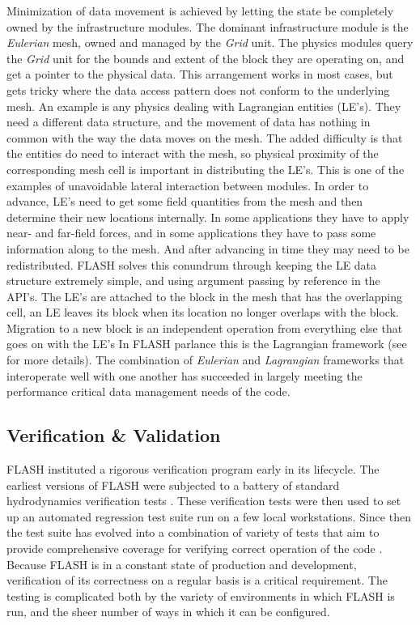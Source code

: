 Minimization of data movement is achieved by letting the state be
completely owned by the infrastructure modules. The dominant
infrastructure module is the {\em Eulerian} mesh, owned and managed by
the {\em Grid} unit. The physics modules query the {\em Grid} unit
for the bounds and extent of the block they are operating on, and
get a pointer to the physical data. This arrangement works in most
cases, but gets tricky where  the data access pattern does not conform
to the underlying mesh. An example is any physics dealing with
Lagrangian entities (LE's). They need a different data structure, and
the movement of data has nothing in common with the way the data moves
on the mesh. The added difficulty is that the entities do need to
interact with the mesh, so physical proximity of the corresponding
mesh cell is important in distributing the LE's. This is one of the
examples of unavoidable lateral interaction between modules. In order
to advance, LE's need to get some field quantities from the mesh and
then determine their new locations internally. In some applications
they have to apply near- and far-field forces, and in some
applications they have to pass some information along to the mesh. And
after advancing in time they may need to be redistributed. FLASH solves
this conundrum through keeping the LE data structure extremely simple,
and using argument passing by reference in the API's. The LE's are
attached to the block in the mesh that has the overlapping cell, an LE
leaves its block when its location no longer overlaps with the
block. Migration to a new block is an independent operation from
everything else that goes on with the LE's In FLASH parlance this is
the Lagrangian framework (see \cite{Dubey2012} for more details). The
combination of {\em Eulerian} and {\em Lagrangian} frameworks that
interoperate well with one another has succeeded in largely meeting the
performance critical data management needs of the code. 

\subsection{Verification \& Validation}
\label{sec:FLASHvandv}

FLASH instituted a rigorous verification program early in its
lifecycle. The earliest versions of FLASH were subjected to
a battery of standard hydrodynamics verification tests
\cite{Fryxell2000}. These verification tests were then used to set up
an automated regression test suite run on a few local
workstations. Since then the test suite has evolved into a
combination of variety of tests that aim to provide comprehensive
coverage for verifying correct operation of the code
\cite{Dubey2013,Calder2005}. Because FLASH is in a constant state of
production and 
development, verification of its correctness on a regular basis is a
critical requirement.  The testing is complicated both by the variety 
of environments in which FLASH is run, and the sheer number of ways in
which it can be configured. 

